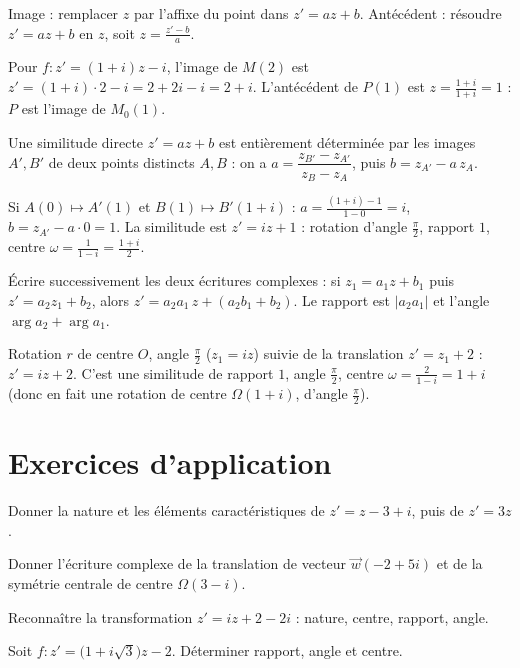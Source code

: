 Image : remplacer $z$ par l'affixe du point dans $z'=az+b$. Antécédent : résoudre $z'=az+b$ en $z$,
soit $z=\frac{z'-b}{a}$.
\begin{exemple}
Pour $f:z'=(1+i)z-i$, l'image de $M(2)$ est $z'=(1+i)\cdot2-i=2+2i-i=2+i$. L'antécédent de
$P(1)$ est $z=\frac{1+i}{1+i}=1$ : $P$ est l'image de $M_0(1)$.
\end{exemple}

Une similitude directe $z'=az+b$ est entièrement déterminée par les images $A',B'$ de deux
points distincts $A,B$ : on a $a=\dfrac{z_{B'}-z_{A'}}{z_B-z_A}$, puis $b=z_{A'}-a\,z_A$.
\begin{exemple}
Si $A(0)\mapsto A'(1)$ et $B(1)\mapsto B'(1+i)$ : $a=\frac{(1+i)-1}{1-0}=i$, $b=z_{A'}-a\cdot0=1$.
La similitude est $z'=iz+1$ : rotation d'angle $\frac\pi2$, rapport $1$, centre $\omega=\frac1{1-i}=\frac{1+i}2$.
\end{exemple}

Écrire successivement les deux écritures complexes : si $z_1=a_1z+b_1$ puis $z'=a_2z_1+b_2$, alors
$z'=a_2a_1\,z+(a_2b_1+b_2)$. Le rapport est $|a_2a_1|$ et l'angle $\arg a_2+\arg a_1$.
\begin{exemple}
Rotation $r$ de centre $O$, angle $\frac\pi2$ ($z_1=iz$) suivie de la translation $z'=z_1+2$ :
$z'=iz+2$. C'est une similitude de rapport $1$, angle $\frac\pi2$, centre $\omega=\frac2{1-i}=1+i$
(donc en fait une rotation de centre $\Omega(1+i)$, d'angle $\frac\pi2$).
\end{exemple}

\section{Exercices d'application}

\exo{} Donner la nature et les éléments caractéristiques de $z'=z-3+i$, puis de $z'=3z$.

\exo{} Donner l'écriture complexe de la translation de vecteur $\vec w(-2+5i)$ et de la
symétrie centrale de centre $\Omega(3-i)$.

\exo{} Reconnaître la transformation $z'=iz+2-2i$ : nature, centre, rapport, angle.

\exo{} Soit $f:z'=\big(1+i\sqrt3\big)z-2$. Déterminer rapport, angle et centre.

